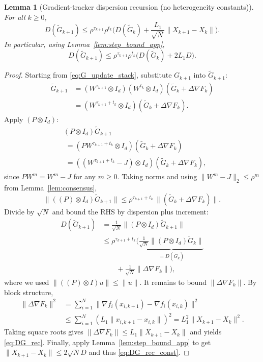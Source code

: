 \documentclass[11pt,a4paper]{article}
\def\one{1}%
\def\J{J}%
\def\Pmat{P}%
\newtheorem{lemma}[theorem]{Lemma}
\newcommand{\one}{\mathbf{1}}
\newcommand{\J}{\left(\frac{1}{N}\one\one^\top\right)}
\newcommand{\Pmat}{I-\J}
\begin{document}
\begin{lemma}[Gradient-tracker dispersion recursion (no heterogeneity constants)]\label{lem:DG_rec}
For all $k\ge0$,
\begin{equation}\label{eq:DG_rec}
D(\tilde G_{k+1})
\le \rho^{\tau_{k+1}}\rho^{t_k}\Big(D(\tilde G_k)+\frac{L_1}{\sqrt N}\|X_{k+1}-X_k\|\Big).
\end{equation}
In particular, using Lemma~\ref{lem:step_bound_app},
\begin{equation}\label{eq:DG_rec_const}
D(\tilde G_{k+1})
\le \rho^{\tau_{k+1}}\rho^{t_k}\Big(D(\tilde G_k)+2L_1D\Big).
\end{equation}
\end{lemma}
\begin{proof}
Starting from \eqref{eq:G_update_stack}, substitute $G_{k+1}$ into $\tilde G_{k+1}$:
\begin{align*}
\tilde G_{k+1}
&=(W^{\tau_{k+1}}\!\otimes\! I_d)(W^{t_k}\!\otimes\! I_d)(\tilde G_k\!+\!\Delta\nabla F_k)\\
&=(W^{\tau_{k+1}+t_k}\!\otimes\! I_d)(\tilde G_k\!+\!\Delta\nabla F_k).
\end{align*}
Apply $(\Pmat\otimes I_d)$:
\begin{align*}
&(\Pmat\!\otimes\! I_d)\tilde G_{k+1}\\
&\;=(\Pmat W^{\tau_{k+1}+t_k}\!\otimes\! I_d)(\tilde G_k+\Delta\nabla F_k)\\
&\;=((W^{\tau_{k+1}+t_k}\!-\!\J)\!\otimes\! I_d)(\tilde G_k+\Delta\nabla F_k),
\end{align*}
since $\Pmat W^m=W^m-\J$ for any $m\ge0$.
Taking norms and using $\|W^{m}-\J\|_2\le \rho^{m}$ from Lemma~\ref{lem:consensus},
\[
\|((\Pmat)\otimes I_d)\tilde G_{k+1}\|
\le \rho^{\tau_{k+1}+t_k}\,\|(\tilde G_k+\Delta\nabla F_k)\|.
\]
Divide by $\sqrt N$ and bound the RHS by dispersion plus increment:
\begin{align*}
D(\tilde G_{k+1})
&=\tfrac1{\sqrt N}\|(\Pmat\!\otimes\! I_d)\tilde G_{k+1}\|\\
&\le \rho^{\tau_{k+1}+t_k}\bigl(
\underbrace{\tfrac1{\sqrt N}\|(\Pmat\!\otimes\! I_d)\tilde G_k\|}_{=D(\tilde G_k)}\\
&\qquad+\tfrac1{\sqrt N}\|\Delta\nabla F_k\|\bigr),
\end{align*}
where we used $\|((\Pmat)\otimes I)u\|\le \|u\|$.
It remains to bound $\|\Delta\nabla F_k\|$.
By block structure,
\begin{align*}
\|\Delta\nabla F_k\|^2
&=\textstyle\sum_{i=1}^N\|\nabla f_i(x_{i,k+1})\!-\!\nabla f_i(x_{i,k})\|^2\\
&\le \textstyle\sum_{i=1}^N (L_1\|x_{i,k+1}\!-\!x_{i,k}\|)^2
=L_1^2\|X_{k+1}\!-\!X_k\|^2.
\end{align*}
Taking square roots gives $\|\Delta\nabla F_k\|\le L_1\|X_{k+1}-X_k\|$ and yields \eqref{eq:DG_rec}.
Finally, apply Lemma~\ref{lem:step_bound_app} to get $\|X_{k+1}-X_k\|\le 2\sqrt N D$ and thus \eqref{eq:DG_rec_const}.
\end{proof}
\end{document}

